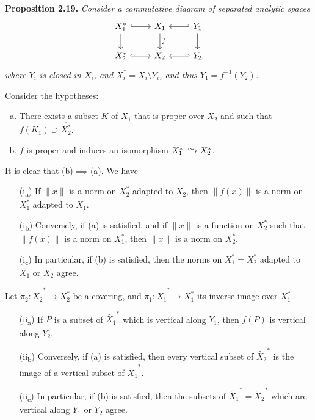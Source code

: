 \documentclass{report}
\newenvironment{itenv}[1]
  {\phantomsection\par\medskip\noindent\textbf{#1.}\itshape}
  {\medskip}
\newcommand{\simto}{\xrightarrow{\raisebox{-0.7ex}[0ex][0ex]{$\sim$}}}
\newcommand{\oldpage}[1]{\marginpar{\footnotesize$\Big\vert$ \textit{p.~#1}}}
\begin{document}
\begin{itenv}{Proposition 2.19}
\label{II.2.19}
  Consider a commutative diagram of separated analytic spaces
  \[
    \begin{tikzcd}
      X_1^* \rar[hook] \dar
      & X_1 \dar["f"]
      & Y_1 \lar[hook'] \dar
    \\X_2^* \rar[hook]
      & X_2
      & Y_2 \lar[hook']
    \end{tikzcd}
  \]
  where $Y_i$ is closed in $X_i$, and $X_i^*=X_i\setminus Y_i$, and thus $Y_1=f^{-1}(Y_2)$.

  Consider the hypotheses:
  \begin{enumerate}[(a)]
    \item There exists a subset $K$ of $X_1$ that is proper over $X_2$ and such that $f(K_1)\supset\overline{X_2^*}$.
    \item $f$ is proper and induces an isomorphism $X_1^*\simto X_2^*$.
  \end{enumerate}

  It is clear that \mbox{(b)$\implies$(a)}.
  We have
  \begin{enumerate}
    \item[{\rm(i\textsubscript{a})}] If $\|x\|$ is a norm on $X_2^*$ adapted to $X_2$, then $\|f(x)\|$ is a norm on $X_1^*$ adapted to $X_1$.
\oldpage{69}
    \item[{\rm(i\textsubscript{b})}] Conversely, if {\rm(a)} is satisfied, and if $\|x\|$ is a function on $X_2^*$ such that $\|f(x)\|$ is a norm on $X_1^*$, then $\|x\|$ is a norm on $X_2^*$.
    \item[{\rm(i\textsubscript{c})}] In particular, if {\rm(b)} is satisfied, then the norms on $X_1^*=X_2^*$ adapted to $X_1$ or $X_2$ agree.
  \end{enumerate}

  Let $\pi_2\colon\widetilde{X_2}^*\to X_2^*$ be a covering, and $\pi_1\colon\widetilde{X_1}^*\to X_1^*$ its inverse image over $X_1^*$.
  \begin{enumerate}
    \item[{\rm(ii\textsubscript{a})}] If $P$ is a subset of $\widetilde{X_1}^*$ which is vertical along $Y_1$, then $f(P)$ is vertical along $Y_2$.
    \item[{\rm(ii\textsubscript{b})}] Conversely, if {\rm(a)} is satisfied, then every vertical subset of $\widetilde{X_2}^*$ is the image of a vertical subset of $\widetilde{X_1}^*$.
    \item[{\rm(ii\textsubscript{c})}] In particular, if {\rm(b)} is satisfied, then the subsets of $\widetilde{X_1}^*=\widetilde{X_2}^*$ which are vertical along $Y_1$ or $Y_2$ agree.
  \end{enumerate}


\end{itenv}
\end{document}
